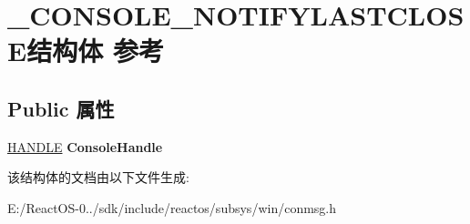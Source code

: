 \hypertarget{struct___c_o_n_s_o_l_e___n_o_t_i_f_y_l_a_s_t_c_l_o_s_e}{}\section{\+\_\+\+C\+O\+N\+S\+O\+L\+E\+\_\+\+N\+O\+T\+I\+F\+Y\+L\+A\+S\+T\+C\+L\+O\+S\+E结构体 参考}
\label{struct___c_o_n_s_o_l_e___n_o_t_i_f_y_l_a_s_t_c_l_o_s_e}
\subsection*{Public 属性}
\begin{DoxyCompactItemize}
\item 
\mbox{\label{struct___c_o_n_s_o_l_e___n_o_t_i_f_y_l_a_s_t_c_l_o_s_e_acf558efacc01a5a3238d68e0cc914838}} 
\hyperlink{interfacevoid}{H\+A\+N\+D\+LE} {\bfseries Console\+Handle}
\end{DoxyCompactItemize}


该结构体的文档由以下文件生成\+:\begin{DoxyCompactItemize}
\item 
E\+:/\+React\+O\+S-\/0../sdk/include/reactos/subsys/win/conmsg.\+h\end{DoxyCompactItemize}
